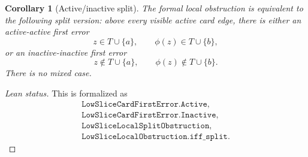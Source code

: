 \documentclass[11pt]{article}
\newtheorem{corollary}{Corollary}
\begin{document}
\begin{corollary}[Active/inactive split]
The formal local obstruction is equivalent to the following split version: above
every visible active card edge, there is either an active-active first error
\[
  z\in T\cup\{a\},\qquad \phi(z)\in T\cup\{b\},
\]
or an inactive-inactive first error
\[
  z\notin T\cup\{a\},\qquad \phi(z)\notin T\cup\{b\}.
\]
There is no mixed case.
\end{corollary}

\begin{proof}[Lean status]
This is formalized as
\[
\begin{array}{l}
\texttt{LowSliceCardFirstError.Active},\\
\texttt{LowSliceCardFirstError.Inactive},\\
\texttt{LowSliceLocalSplitObstruction},\\
\texttt{LowSliceLocalObstruction.iff\_split}.
\end{array}
\]
\end{proof}
\end{document}
